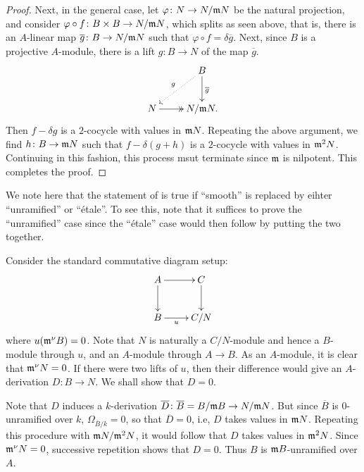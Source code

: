 \begin{proof}
    Next, in the general case, let $\varphi\colon N\to N/\mathfrak{m} N$ be the natural projection, and consider $\varphi\circ f\colon B\times B\to N/\mathfrak{m} N$, which splits as seen above, that is, there is an $A$-linear map $\overline g\colon B\to N/\mathfrak{m} N$ such that $\varphi\circ f = \delta\overline g$. Next, since $B$ is a projective $A$-module, there is a lift $g\colon B\to N$ of the map $\overline g$. 
    \begin{equation*}
        \xymatrix {
            & B\ar[d]^{\overline g}\ar@{.>}[ld]_{g}\\
            N\ar@{->>}[r] & N/\frakm N.
        }
    \end{equation*}
    Then $f - \delta g$ is a $2$-cocycle with values in $\mathfrak{m} N$. Repeating the above argument, we find $h\colon B\to\mathfrak{m} N$ such that $f - \delta(g + h)$ is a $2$-cocycle with values in $\mathfrak{m}^2 N$. Continuing in this fashion, this process msut terminate since $\mathfrak{m}$ is nilpotent. This completes the proof.
\end{proof}

\begin{remark}
    We note here that the statement of  is true if ``smooth'' is replaced by eihter ``unramified'' or ``\'etale''. To see this, note that it suffices to prove the ``unramified'' case since the ``\'etale'' case would then follow by putting the two together.

    Consider the standard commutative diagram setup: 
    \begin{equation*}
        \xymatrix {
            A\ar[r]\ar[d] & C\ar[d]\\
            B\ar[r]_-u & C/N
        }
    \end{equation*}
    where $u(\mathfrak{m}^\nu B) = 0$. Note that $N$ is naturally a $C/N$-module and hence a $B$-module through $u$, and an $A$-module through $A\to B$. As an $A$-module, it is clear that $\mathfrak{m}^\nu N = 0$. If there were two lifts of $u$, then their difference would give an $A$-derivation $D\colon B\to N$. We shall show that $D = 0$. 
    
    Note that $D$ induces a $k$-derivation $\overline D\colon \overline{B} = B/\mathfrak{m} B\to N/\mathfrak{m} N$. But since $\overline B$ is $0$-unramified over $k$, $\Omega_{\overline B/k} = 0$, so that $\overline D = 0$, i.e, $D$ takes values in $\mathfrak{m} N$. Repeating this procedure with $\mathfrak{m} N/\mathfrak{m}^2 N$, it would follow that $D$ takes values in $\mathfrak{m}^2 N$. Since $\mathfrak{m}^\nu N = 0$, successive repetition shows that $D = 0$. Thus $B$ is $\mathfrak{m} B$-unramified over $A$.
\end{remark}